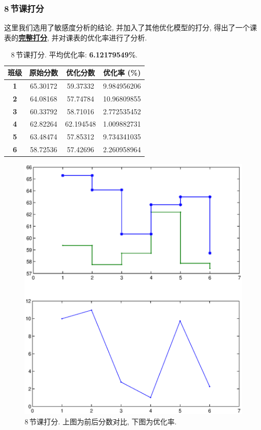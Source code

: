 \documentclass[a4paper]{article}
\begin{document}
  \subsubsection{8\,节课打分}
   这里我们选用了敏感度分析的结论, 并加入了其他优化模型的打分, 得出了一个课表的\hyperlink{program}{\textbf{完整打分}}, 并对课表的优化率进行了分析.
   \begin{table}[H]
   \centering
   \begin{tabular}{|c|c|c|c|}
   \hline
   \bf 班级 & \bf 原始分数 & \bf 优化分数 & \bf 优化率 (\%) \\\hline
   \bf 1 & 65.30172 & 59.37332 & 9.984956206 \\\hline
   \bf 2 & 64.08168 & 57.74784 & 10.96809855 \\\hline
   \bf 3 & 60.33792 & 58.71016 & 2.772535452 \\\hline
   \bf 4 & 62.82264 & 62.194548 & 1.009882731 \\\hline
   \bf 5 & 63.48474 & 57.85312 & 9.734341035 \\\hline
   \bf 6 & 58.72536 & 57.42696 & 2.260958964 \\\hline
   \end{tabular}
   \caption{8\,节课打分. 平均优化率: \textbf{6.12179549\%}.}
   \end{table}
   \begin{figure}[H]
   \centerline{\includegraphics[scale=0.7]{8lessons.eps}}
   \caption{8\,节课打分. 上图为前后分数对比, 下图为优化率.}
   \end{figure}
\clearpage
\end{document}
